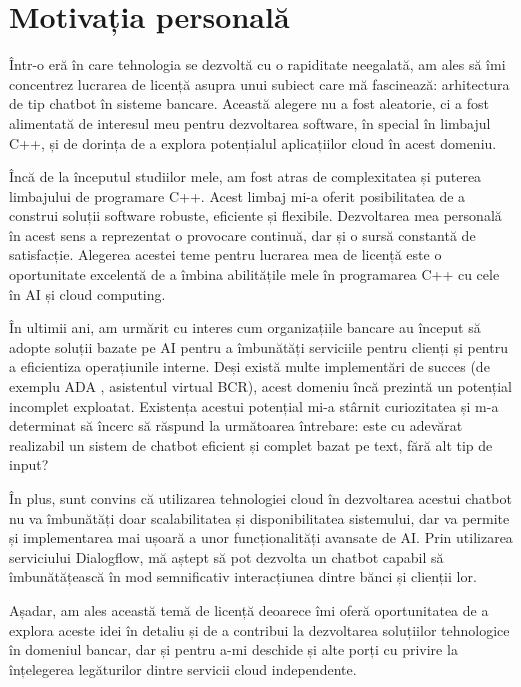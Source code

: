 \section{Motivația personală}

Într-o eră în care tehnologia se dezvoltă cu o rapiditate neegalată, am ales să îmi concentrez lucrarea de licență asupra unui subiect care mă fascinează: arhitectura de tip chatbot în sisteme bancare. Această alegere nu a fost aleatorie, ci a fost alimentată de interesul meu pentru dezvoltarea software, în special în limbajul C++, și de dorința de a explora potențialul aplicațiilor cloud în acest domeniu.

Încă de la începutul studiilor mele, am fost atras de complexitatea și puterea limbajului de programare C++. Acest limbaj mi-a oferit posibilitatea de a construi soluții software robuste, eficiente și flexibile. Dezvoltarea mea personală în acest sens a reprezentat o provocare continuă, dar și o sursă constantă de satisfacție. Alegerea acestei teme pentru lucrarea mea de licență este o oportunitate excelentă de a îmbina abilitățile mele în programarea C++ cu cele în AI și cloud computing.

În ultimii ani, am urmărit cu interes cum organizațiile bancare au început să adopte soluții bazate pe AI pentru a îmbunătăți serviciile pentru clienți și pentru a eficientiza operațiunile interne. Deși există multe implementări de succes (de exemplu ADA \cite{ADA}, asistentul virtual BCR), acest domeniu încă prezintă un potențial incomplet exploatat. Existența acestui potențial mi-a stârnit curiozitatea și m-a determinat să încerc să răspund la următoarea întrebare: este cu adevărat realizabil un sistem de chatbot eficient și complet bazat pe text, fără alt tip de input?

În plus, sunt convins că utilizarea tehnologiei cloud în dezvoltarea acestui chatbot nu va îmbunătăți doar scalabilitatea și disponibilitatea sistemului, dar va permite și implementarea mai ușoară a unor funcționalități avansate de AI. Prin utilizarea serviciului Dialogflow, mă aștept să pot dezvolta un chatbot capabil să îmbunătățească în mod semnificativ interacțiunea dintre bănci și clienții lor.

Așadar, am ales această temă de licență deoarece îmi oferă oportunitatea de a explora aceste idei în detaliu și de a contribui la dezvoltarea soluțiilor tehnologice în domeniul bancar, dar și pentru a-mi deschide și alte porți cu privire la înțelegerea legăturilor dintre servicii cloud independente.

